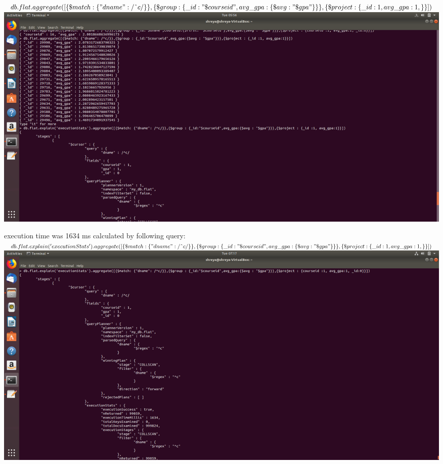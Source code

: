 \documentclass[10pt]{article}
\begin{document}
\begin{enumerate}
\begin{enumerate}
				$
				\\db.flat.aggregate([
				\\\{\$match: 
				    \\\{"dname":
				    /\string^c/\}\},\{\$group : \\\{\_id:"\$courseid",avg\_gpa:
				    \\\{\$avg : "\$gpa"\}\}\},
				    \\\{\$project : \{\_id:1, avg\_gpa:1, \}
				\\\}])
				$
				\\
				\includegraphics[scale=0.30]{mongo_1.png}
				
				execution time was 1634 ms 
				calculated by following query:
				$
				\\db.flat.explain('executionStats').aggregate([
				\\\{\$match: 
				    \\\{"dname":
				    /\string^c/\}\},\{\$group : \\\{\_id:"\$courseid",avg\_gpa:
				    \\\{\$avg : "\$gpa"\}\}\},
				    \\\{\$project : \{\_id:1, avg\_gpa:1, \}
				\\\}])
				$
				\\
				\includegraphics[scale=0.30]{mongo_2.png}


\end{enumerate}
\end{enumerate}
\end{document}
